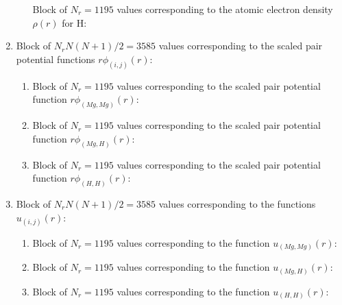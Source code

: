 \documentclass{article}
\begin{document}
\begin{enumerate}
\begin{enumerate}
			Block of $N_{r}=1195$ values corresponding to the atomic electron density $\rho(r)$ for H:
		\end{enumerate}

		\item  Block of $N_rN(N+1)/2=3585$ values corresponding to the scaled pair potential functions $r\phi_{(i,j)}(r)$:
		\begin{enumerate}
			\item Block of $N_r=1195$ values corresponding to the scaled pair potential function $r\phi_{(Mg,Mg)}(r)$:
			
			\item Block of $N_r=1195$ values corresponding to the scaled pair potential function $r\phi_{(Mg,H)}(r)$:
			
			\item Block of $N_r=1195$ values corresponding to the scaled pair potential function $r\phi_{(H,H)}(r)$:
		\end{enumerate}
		
		\item  Block of $N_rN(N+1)/2=3585$ values corresponding to the functions $u_{(i,j)}(r)$:
		\begin{enumerate}
			\item Block of $N_r=1195$ values corresponding to the function $u_{(Mg,Mg)}(r)$:
			
			\item Block of $N_r=1195$ values corresponding to the function $u_{(Mg,H)}(r)$:
			
			\item Block of $N_r=1195$ values corresponding to the function $u_{(H,H)}(r)$:
		\end{enumerate}
		

\end{enumerate}
\end{document}
